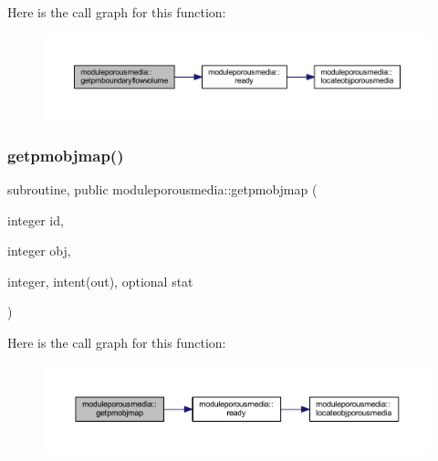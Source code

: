 Here is the call graph for this function\+:\nopagebreak
\begin{figure}[H]
\begin{center}
\leavevmode
\includegraphics[width=350pt]{namespacemoduleporousmedia_af76c86e60836074eb54ae108e4cbb7e5_cgraph}
\end{center}
\end{figure}
\mbox{\label{namespacemoduleporousmedia_ab411441ee4f139b7e2efb9f91cad1778}} 
\subsubsection{\texorpdfstring{getpmobjmap()}{getpmobjmap()}}
{\footnotesize\ttfamily subroutine, public moduleporousmedia\+::getpmobjmap (\begin{DoxyParamCaption}\item[{integer}]{id,  }\item[{integer}]{obj,  }\item[{integer, intent(out), optional}]{stat }\end{DoxyParamCaption})}

Here is the call graph for this function\+:\nopagebreak
\begin{figure}[H]
\begin{center}
\leavevmode
\includegraphics[width=350pt]{namespacemoduleporousmedia_ab411441ee4f139b7e2efb9f91cad1778_cgraph}
\end{center}
\end{figure}
\mbox{\label{namespacemoduleporousmedia_a92e48a5d06b01af62070aecdf43d84e8}} 
